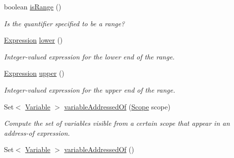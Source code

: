 \begin{DoxyCompactItemize}
\hypertarget{classedu_1_1udel_1_1cis_1_1vsl_1_1civl_1_1model_1_1common_1_1expression_1_1CommonQuantifiedExpression_ab30f5d42887a8980a39d31e9768b108e}{}boolean \hyperlink{classedu_1_1udel_1_1cis_1_1vsl_1_1civl_1_1model_1_1common_1_1expression_1_1CommonQuantifiedExpression_ab30f5d42887a8980a39d31e9768b108e}{is\+Range} ()\label{classedu_1_1udel_1_1cis_1_1vsl_1_1civl_1_1model_1_1common_1_1expression_1_1CommonQuantifiedExpression_ab30f5d42887a8980a39d31e9768b108e}

\begin{DoxyCompactList}\small\item\em Is the quantifier specified to be a range? \end{DoxyCompactList}\item 
\hyperlink{interfaceedu_1_1udel_1_1cis_1_1vsl_1_1civl_1_1model_1_1IF_1_1expression_1_1Expression}{Expression} \hyperlink{classedu_1_1udel_1_1cis_1_1vsl_1_1civl_1_1model_1_1common_1_1expression_1_1CommonQuantifiedExpression_a9fce6515dc6222c776cc6357d0faf395}{lower} ()
\begin{DoxyCompactList}\small\item\em Integer-\/valued expression for the lower end of the range. \end{DoxyCompactList}\item 
\hyperlink{interfaceedu_1_1udel_1_1cis_1_1vsl_1_1civl_1_1model_1_1IF_1_1expression_1_1Expression}{Expression} \hyperlink{classedu_1_1udel_1_1cis_1_1vsl_1_1civl_1_1model_1_1common_1_1expression_1_1CommonQuantifiedExpression_a0c8b7a84134e269c29f27638fbc3fa5e}{upper} ()
\begin{DoxyCompactList}\small\item\em Integer-\/valued expression for the upper end of the range. \end{DoxyCompactList}\item 
Set$<$ \hyperlink{interfaceedu_1_1udel_1_1cis_1_1vsl_1_1civl_1_1model_1_1IF_1_1variable_1_1Variable}{Variable} $>$ \hyperlink{classedu_1_1udel_1_1cis_1_1vsl_1_1civl_1_1model_1_1common_1_1expression_1_1CommonQuantifiedExpression_a156d8b88376ce368cfe9c6ae4e74b86d}{variable\+Addressed\+Of} (\hyperlink{interfaceedu_1_1udel_1_1cis_1_1vsl_1_1civl_1_1model_1_1IF_1_1Scope}{Scope} scope)
\begin{DoxyCompactList}\small\item\em Compute the set of variables visible from a certain scope that appear in an address-\/of expression. \end{DoxyCompactList}\item 
Set$<$ \hyperlink{interfaceedu_1_1udel_1_1cis_1_1vsl_1_1civl_1_1model_1_1IF_1_1variable_1_1Variable}{Variable} $>$ \hyperlink{classedu_1_1udel_1_1cis_1_1vsl_1_1civl_1_1model_1_1common_1_1expression_1_1CommonQuantifiedExpression_a3092aa670e4fc23fe1a24fbe59c59d5f}{variable\+Addressed\+Of} ()

\end{DoxyCompactItemize}

